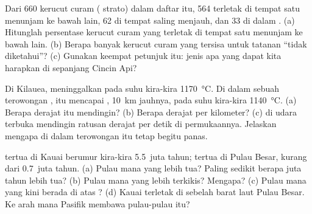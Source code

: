 \begin{exercise}[$\star\star$]\label{exo:g7:volcanoes:6}
Dari 660 kerucut curam ( strato) dalam daftar itu, 564 terletak
di tempat satu  menunjam ke bawah  lain, 62 di tempat
 saling menjauh, dan 33 di dalam . (a) Hitunglah
persentase kerucut curam yang terletak di tempat satu  menunjam ke
bawah  lain. (b) Berapa banyak kerucut curam yang tersisa untuk
tatanan ``tidak diketahui''? (c) Gunakan keempat petunjuk itu: jenis 
apa yang dapat kita harapkan di sepanjang Cincin Api?
\end{exercise}

\begin{exercise}[$\star\star$]\label{exo:g7:volcanoes:7}
Di Kilauea,  meninggalkan  pada suhu kira-kira
\qty{1170}{\degreeCelsius}. Di dalam sebuah terowongan ,  itu
mencapai , \qty{10}{km} jauhnya, pada suhu kira-kira
\qty{1140}{\degreeCelsius}. (a) Berapa derajat  itu mendingin?
(b) Berapa derajat per kilometer? (c)  di udara terbuka mendingin
ratusan derajat per detik di permukaannya. Jelaskan mengapa  di dalam
terowongan itu tetap begitu panas.
\end{exercise}

\begin{exercise}[$\star\star$]\label{exo:g7:volcanoes:8}
 tertua di Kauai berumur kira-kira 5.5~juta tahun;  tertua di
Pulau Besar, kurang dari 0.7~juta tahun. (a) Pulau mana yang lebih tua?
Paling sedikit berapa juta tahun lebih tua? (b) Pulau mana yang lebih
terkikis? Mengapa? (c) Pulau mana yang kini berada di atas ?
(d) Kauai terletak di sebelah barat laut Pulau Besar. Ke arah mana 
Pasifik membawa pulau-pulau itu?
\end{exercise}

